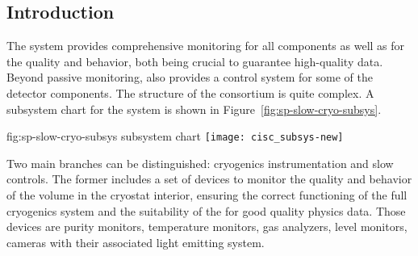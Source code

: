 \subsection{Introduction}
\label{sec:fdsp-slow-cryo-intro}



The  system provides comprehensive monitoring for all  components as well as for the \lar quality and behavior, both being crucial
to guarantee high-quality data. Beyond passive monitoring,  also provides a control system for some of the detector components. 
The structure of the  consortium is quite complex. A subsystem chart
for the  system is shown in Figure~\ref{fig:sp-slow-cryo-subsys}. 

\begin{dunefigure}{fig:sp-slow-cryo-subsys}
{ subsystem chart}
\texttt{[image: cisc\_subsys-new]}  %
\end{dunefigure}

Two main branches can be distinguished: cryogenics instrumentation and slow controls. The former includes a set of devices 
to monitor the quality and behavior of the \lar volume in the cryostat interior, ensuring the correct functioning of
the full cryogenics system and the suitability of the \lar for good quality physics data. Those devices are 
purity monitors, temperature monitors, gas analyzers, \lar level monitors, cameras with their associated
light emitting system.

